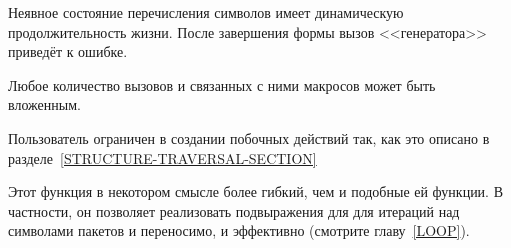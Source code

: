 \begin{defmac}
Неявное состояние перечисления символов имеет динамическую
продолжительность жизни.
После завершения формы  вызов
<<генератора>> приведёт к ошибке.

Любое количество вызовов  и связанных
с ними макросов может быть вложенным.

Пользователь ограничен в создании побочных действий так, как это описано в
разделе~\ref{STRUCTURE-TRAVERSAL-SECTION}

\beforenoterule
\begin{rationale}
Этот функция в некотором смысле более гибкий, чем  и
подобные ей функции.
В частности, он позволяет реализовать подвыражения для  для
итераций над символами пакетов и переносимо, и эффективно (смотрите
главу~\ref{LOOP}).
\end{rationale}
\afternoterule


\end{defmac}
\fi